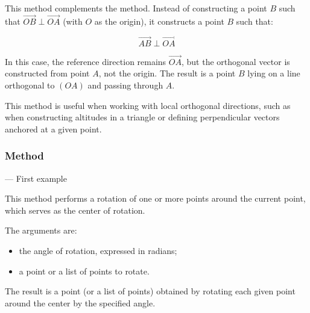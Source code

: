 This method complements the  method. Instead of constructing a point $B$ such that $\overrightarrow{OB} \perp \overrightarrow{OA}$ (with $O$ as the origin), it constructs a point $B$ such that:

\[
\overrightarrow{AB} \perp \overrightarrow{OA}
\]

\noindent
In this case, the reference direction remains $\overrightarrow{OA}$, but the orthogonal vector is constructed from point $A$, not the origin. The result is a point $B$ lying on a line orthogonal to $(OA)$ and passing through $A$.

\medskip
\noindent
This method is useful when working with local orthogonal directions, such as when constructing altitudes in a triangle or defining perpendicular vectors anchored at a given point.

\vspace{1em}


\begin{tkzexample}[latex=7cm]
 \begin{center}
 \end{center}
\end{tkzexample}

\subsubsection{Method } — First example
\label{ssub:example_rotation_of_points}

This method performs a rotation of one or more points around the current point, which serves as the center of rotation.

\medskip
\noindent
The arguments are:
\begin{itemize}
  \item the angle of rotation, expressed in radians;
  \item a point or a list of points to rotate.
\end{itemize}

\noindent
The result is a point (or a list of points) obtained by rotating each given point around the center by the specified angle.

